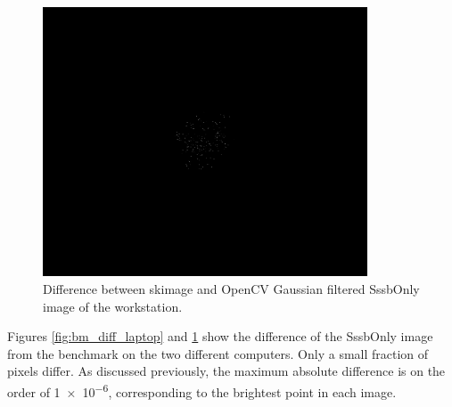 \begin{figure}[htb]
    \begin{center}
        \includegraphics[height=8cm]{doc/thesis/0_figures/cv_skimage/diff_workstation.png}
    \end{center}
    \caption{Difference between \gls{skimage} and OpenCV Gaussian filtered SssbOnly image of the workstation.}
    \label{fig:bm_diff_workstation}
\end{figure}

Figures \ref{fig:bm_diff_laptop} and \ref{fig:bm_diff_workstation} show the difference of the SssbOnly image from the benchmark on the two different computers. Only a small fraction of pixels differ. As discussed previously, the maximum absolute difference is on the order of \SI{1e-6}{}, corresponding to the brightest point in each image. 
